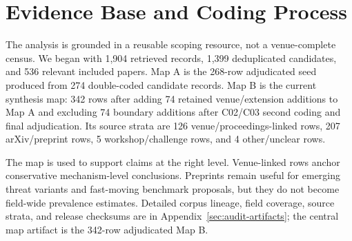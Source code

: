 \documentclass[11pt]{article}
\begin{document}


\section{Evidence Base and Coding Process}

The analysis is grounded in a reusable scoping resource, not a venue-complete census. We began with 1,904 retrieved records, 1,399 deduplicated candidates, and 536 relevant included papers. Map A is the 268-row adjudicated seed produced from 274 double-coded candidate records. Map B is the current synthesis map: 342 rows after adding 74 retained venue/extension additions to Map A and excluding 74 boundary additions after C02/C03 second coding and final adjudication. Its source strata are 126 venue/proceedings-linked rows, 207 arXiv/preprint rows, 5 workshop/challenge rows, and 4 other/unclear rows.

The map is used to support claims at the right level. Venue-linked rows anchor conservative mechanism-level conclusions. Preprints remain useful for emerging threat variants and fast-moving benchmark proposals, but they do not become field-wide prevalence estimates. Detailed corpus lineage, field coverage, source strata, and release checksums are in Appendix~\ref{sec:audit-artifacts}; the central map artifact is the 342-row adjudicated Map B.
\end{document}
